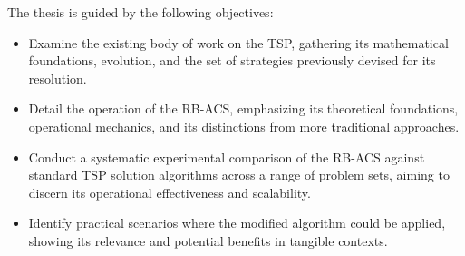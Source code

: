 The thesis is guided by the following objectives:

\begin{itemize}
	\item Examine the existing body of work on the \Gls{TSP}, gathering its mathematical foundations, evolution, and the set of strategies previously devised for its resolution.
  \item Detail the operation of the \Gls{RB-ACS}, emphasizing its theoretical foundations, operational mechanics, and its distinctions from more traditional approaches.
  \item Conduct a systematic experimental comparison of the \Gls{RB-ACS} against standard \Gls{TSP} solution algorithms across a range of problem sets, aiming to discern its operational effectiveness and scalability.
	\item Identify practical scenarios where the modified algorithm could be applied, showing its relevance and potential benefits in tangible contexts.
\end{itemize}





